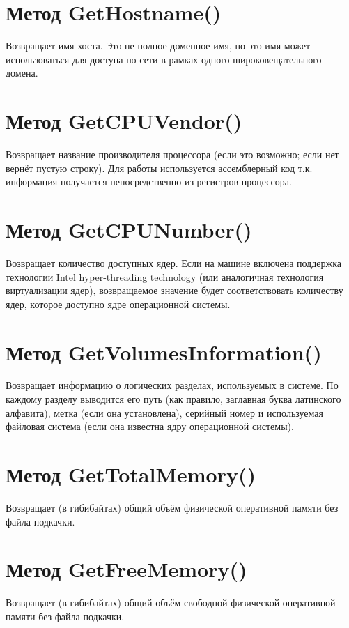 \documentclass[a4paper, 12pt]{report}		%
\begin{document}
\section*{Метод GetHostname()}
Возвращает имя хоста. Это не полное доменное имя, но это имя может использоваться для доступа по сети в рамках одного широковещательного домена.

\section*{Метод GetCPUVendor()}
Возвращает название производителя процессора (если это возможно; если нет вернёт пустую строку). Для работы используется ассемблерный код т.к. информация получается непосредственно из регистров процессора.

\section*{Метод GetCPUNumber()}
Возвращает количество доступных ядер. Если на машине включена поддержка технологии Intel hyper-threading technology (или аналогичная технология виртуализации ядер), возвращаемое значение будет соответствовать количеству ядер, которое доступно ядре операционной системы.

\section*{Метод GetVolumesInformation()}
Возвращает информацию о логических разделах, используемых в системе. По каждому разделу выводится его путь (как правило, заглавная буква латинского алфавита), метка (если она установлена), серийный номер и используемая файловая система (если она известна ядру операционной системы).

\section*{Метод GetTotalMemory()}
Возвращает (в гибибайтах) общий объём физической оперативной памяти без файла подкачки.

\section*{Метод GetFreeMemory()}
Возвращает (в гибибайтах) общий объём свободной физической оперативной памяти без файла подкачки.
\end{document}

